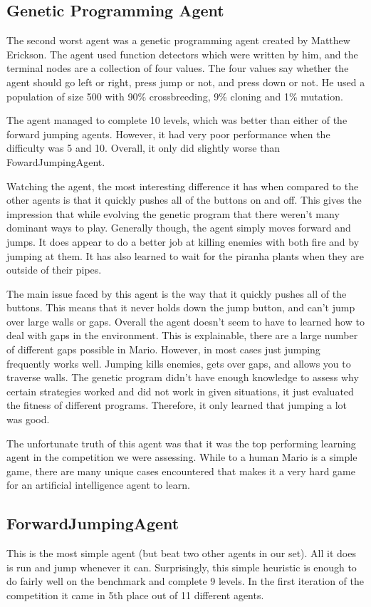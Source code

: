 \documentclass[12pt]{article}
\begin{document}
\begin{multicols*}{2}
\subsection*{Genetic Programming Agent}
The second worst agent was a genetic programming agent created by Matthew Erickson.  
The agent used function detectors which were written by him, and the terminal nodes are a 
collection of four values.  The four values say whether the agent should go left or right, 
press jump or not, and press down or not.  He used a population of size 500 with 90\% 
crossbreeding, 9\% cloning and 1\% mutation.

The agent managed to complete 10 levels, which was better than either of the forward jumping 
agents.  However, it had very poor performance when the difficulty was 5 and 10.  Overall, it only 
did slightly worse than FowardJumpingAgent.

Watching the agent, the most interesting difference it has when compared to the other agents is 
that it quickly pushes all of the buttons on and off.  This gives the impression that while evolving 
the genetic program that there weren't many dominant ways to play.  Generally though, the agent 
simply moves forward and jumps.  It does appear to do a better job at killing enemies with both 
fire and by jumping at them.  It has also learned to wait for the piranha plants when they are outside 
of their pipes.

The main issue faced by this agent is the way that it quickly pushes all of the buttons.  This means that 
it never holds down the jump button, and can't jump over large walls or gaps.  Overall the agent 
doesn't seem to have to learned how to deal with gaps in the environment.  This is explainable, there 
are a large number of different gaps possible in Mario.  However, in most cases just jumping frequently 
works well.    Jumping kills enemies, gets over gaps, and allows you to traverse walls.  
The genetic program didn't have enough knowledge to assess why certain strategies 
worked and did not work in given situations, it just evaluated the fitness of different programs.  
Therefore, it only learned that jumping a lot was good.

The unfortunate truth of this agent was that it was the top performing learning agent in the competition 
we were assessing.  While to a human Mario is a simple game, there are many unique cases 
encountered that makes it a very hard game for an artificial intelligence agent to learn.

\subsection*{ForwardJumpingAgent}
This is the most simple agent (but beat two other agents in our set).  
All it does is run and jump whenever 
it can.  Surprisingly, this simple heuristic is enough to do fairly well on the benchmark and complete 
9 levels.  In the first iteration of the competition it came in 5th place out of 11 different agents.


\end{multicols*}
\end{document}
